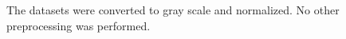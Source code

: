 \documentclass{bmvc2k}
\begin{document}

The datasets were converted to gray scale and normalized. No other preprocessing was performed.
\end{document}
